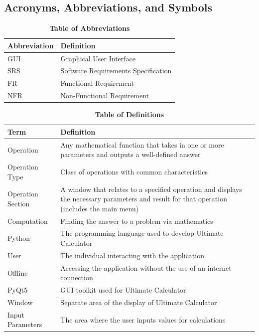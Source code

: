 \documentclass[12pt, titlepage]{article}
\begin{document}
\subsection{Acronyms, Abbreviations, and Symbols}
	
\begin{table}[hbp]
\caption{\textbf{Table of Abbreviations}} \label{Table}
\begin{tabularx}{\textwidth}{p{3cm}X}
\toprule
\textbf{Abbreviation} & \textbf{Definition} \\
\midrule
GUI & Graphical User Interface\\
SRS & Software Requirements Specification\\
FR & Functional Requirement\\
NFR & Non-Functional Requirement\\
\bottomrule
\end{tabularx}

\end{table}

\begin{table}[H]
\caption{\textbf{Table of Definitions}} \label{Table}

\begin{tabularx}{\textwidth}{p{3cm}X}
\toprule
\textbf{Term} & \textbf{Definition}\\
\midrule
Operation & Any mathematical function that takes in one or more parameters and
outputs a well-defined answer\\
Operation Type & Class of operations with common characteristics\\
Operation Section & A window that relates to a specified operation and displays the
necessary parameters and result for that operation (includes the main menu)\\
Computation & Finding the answer to a problem via mathematics\\
Python & The programming language used to develop Ultimate Calculator\\
User & The individual interacting with the application\\
Offline & Accessing the application without the use of an internet connection\\
PyQt5 & GUI toolkit used for Ultimate Calculator\\
Window & Separate area of the display of Ultimate Calculator\\
Input Parameters & The area where the user inputs values for calculations\\
\bottomrule
\end{tabularx}

\end{table}	
\end{document}

